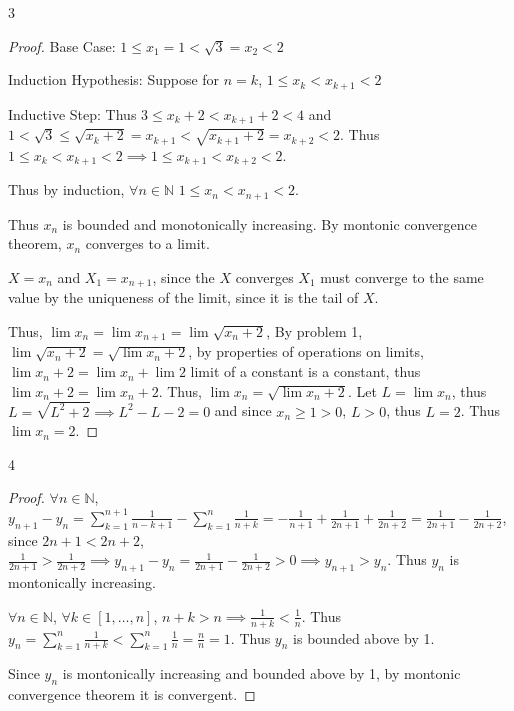 \documentclass{article}
\newcommand{\N}{\mathbb{N}}
\begin{document}
\bigskip

\begin{PROB}{3}\label{Problem 3.}
\end{PROB}
\begin{proof}
    Base Case: $1 \leq x_1 = 1 < \sqrt{3} = x_2 < 2$
    
    Induction Hypothesis: Suppose for $n = k$, $1 \leq x_k < x_{k + 1} < 2$
    
    Inductive Step: Thus $3 \leq x_{k} + 2 < x_{k + 1} + 2 < 4$ and $1 < \sqrt{3} \leq \sqrt{x_{k} + 2} = x_{k + 1} < \sqrt{x_{k + 1} + 2} = x_{k + 2} < 2$. Thus $1 \leq x_k < x_{k + 1} < 2 \implies 1 \leq x_{k + 1} < x_{k + 2} < 2$. 
    
    Thus by induction, $\forall n \in \N$ $1 \leq x_n < x_{n + 1} < 2$. 
    
    Thus $x_n$ is bounded and monotonically increasing. By montonic convergence theorem, $x_n$ converges to a limit. 
    
    $X = x_n$ and $X_1 = x_{n + 1}$, since the $X$ converges $X_1$ must converge to the same value by the uniqueness of the limit, since it is the tail of $X$. 
    
    Thus, $\lim x_n = \lim x_{n + 1} = \lim \sqrt{x_n + 2}$, By problem 1, $\lim \sqrt{x_n + 2} = \sqrt{\lim{x_n + 2}}$, by properties of operations on limits, $\lim{x_n + 2} = \lim{x_n} + \lim{2}$ limit of a constant is a constant, thus $\lim{x_n + 2} = \lim{x_n} + 2$. Thus, $\lim{x_n} = \sqrt{\lim{x_n} + 2}$. Let $L = \lim{x_n}$, thus $L = \sqrt{L^2 + 2} \implies L^2 - L - 2 = 0$ and since $x_n \geq 1 > 0$, $L > 0$, thus $L = 2$. Thus $\lim x_n = 2$.           
\end{proof}

\bigskip

\begin{PROB}{4}\label{Problem 4.}
\end{PROB}
\begin{proof}
    $\forall n \in \N$, $y_{n + 1} - y_n = \sum_{k = 1}^{n + 1} \frac{1}{n - k + 1} - \sum_{k = 1}^{n} \frac{1}{n + k} = - \frac{1}{n + 1} + \frac{1}{2n + 1} + \frac{1}{2n + 2} = \frac{1}{2n + 1} - \frac{1}{2n + 2}$, since $2n + 1 < 2n + 2$, $\frac{1}{2n + 1} > \frac{1}{2n + 2} \implies y_{n + 1} - y_n = \frac{1}{2n + 1} - \frac{1}{2n + 2} > 0 \implies y_{n + 1} > y_n$. Thus $y_n$ is montonically increasing.
    
    $\forall n \in \N$, $\forall k \in [1, \dots, n]$, $n + k > n \implies \frac{1}{n + k} < \frac{1}{n}$. Thus  $y_n = \sum_{k = 1}^{n} \frac{1}{n + k}< \sum_{k = 1}^{n} \frac{1}{n} = \frac{n}{n} = 1$. Thus $y_n$ is bounded above by 1. 
    
    Since $y_n$ is montonically increasing and bounded above by 1, by montonic convergence theorem it is convergent.  
\end{proof}
\end{document}
